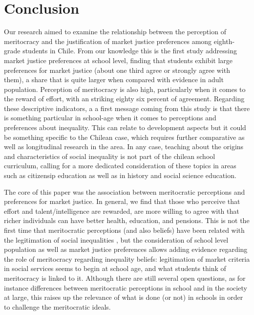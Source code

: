 \documentclass[
    behavsci,
    article,
    submit,
moreauthors
]{mdpi}
\begin{document}
\section{Conclusion}\label{conclusion}

Our research aimed to examine the relationship between the perception of
meritocracy and the justification of market justice preferences among
eighth-grade students in Chile. From our knowledge this is the first
study addressing market justice preferences at school level, finding
that students exhibit large preferences for market justice (about one
third agree or strongly agree with them), a share that is quite larger
when compared with evidence in adult population. Perception of
meritocracy is also high, particularly when it comes to the reward of
effort, with an striking eighty six percent of agreement. Regarding
these descriptive indicators, a a first message coming from this study
is that there is something particular in school-age when it comes to
perceptions and preferences about inequality. This can relate to
development aspects
\citep{rizzo_children_2020, kim_socioeconomic_2020} but it could
be something specific to the Chilean case, which requires further
comparative as well as longitudinal research in the area. In any case,
teaching about the origins and characteristics of social inequality is
not part of the chilean school curriculum, calling for a more dedicated
consideration of these topics in areas such as citizensip education as
well as in history and social science education.

The core of this paper was the association between meritocratic
perceptions and preferences for market justice. In general, we find that
those who perceive that effort and talent/intelligence are rewarded, are
more willing to agree with that richer individuals can have better
health, education, and pensions. This is not the first time that
meritocratic perceptions (and also beliefs) have been related with the
legitimation of social inequalities
\citep{mijs_paradox_2019, darnon_where_2018}, but the consideration of
school level population as well as market justice preferences allows
adding evidence regarding the role of meritocracy regarding inequality
beliefs: legitimation of market criteria in social services seems to
begin at school age, and what students think of meritocracy is linked to
it. Although there are still several open questions, as for instance
differences between meritocratic perceptions in school and in the
society at large, this raises up the relevance of what is done (or not)
in schools in order to challenge the meritocratic ideals.
\end{document}
